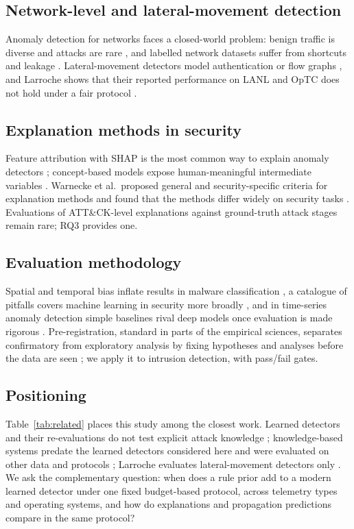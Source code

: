 \documentclass[acmlarge,screen,review]{acmart}
\begin{document}
\subsection{Network-level and lateral-movement detection}
Anomaly detection for networks faces a closed-world problem: benign traffic is diverse and attacks are rare
\cite{sommer2010outside}, and labelled network datasets suffer from shortcuts and leakage \cite{arp2022dos}.
Lateral-movement detectors model authentication or flow graphs
\cite{king2022euler,bowman2020lateral,xu2024argus,khoury2024jbeil,king2026cybergfm}, and Larroche shows that their
reported performance on LANL and OpTC does not hold under a fair protocol \cite{larroche2026fair}.

\subsection{Explanation methods in security}
Feature attribution with SHAP is the most common way to explain anomaly detectors \cite{antwarg2021shap}; concept-based
models expose human-meaningful intermediate variables \cite{koh2020cbm,yuksekgonul2023posthoc}. Warnecke et al.\
proposed general and security-specific criteria for explanation methods and found that the methods differ widely on
security tasks \cite{warnecke2020explain}. Evaluations of ATT\&CK-level explanations against ground-truth attack
stages remain rare; RQ3 provides one.

\subsection{Evaluation methodology}
Spatial and temporal bias inflate results in malware classification \cite{pendlebury2019tesseract}, a catalogue of
pitfalls covers machine learning in security more broadly \cite{arp2022dos}, and in time-series anomaly detection
simple baselines rival deep models once evaluation is made rigorous \cite{sarfraz2024quovadis}. Pre-registration,
standard in parts of the empirical sciences, separates confirmatory from exploratory analysis by fixing hypotheses and
analyses before the data are seen \cite{nosek2018prereg}; we apply it to intrusion detection, with pass/fail gates.

\subsection{Positioning}
Table~\ref{tab:related} places this study among the closest work. Learned detectors and their re-evaluations do not
test explicit attack knowledge \cite{bilot2025simpler}; knowledge-based systems predate the learned detectors
considered here and were evaluated on other data and protocols
\cite{milajerdi2019holmes,hassan2019nodoze,hassan2020rapsheet,milajerdi2019poirot}; Larroche evaluates
lateral-movement detectors only \cite{larroche2026fair}. We ask the complementary question: when does a rule prior add
to a modern learned detector under one fixed budget-based protocol, across telemetry types and operating systems, and
how do explanations and propagation predictions compare in the same protocol?
\end{document}
